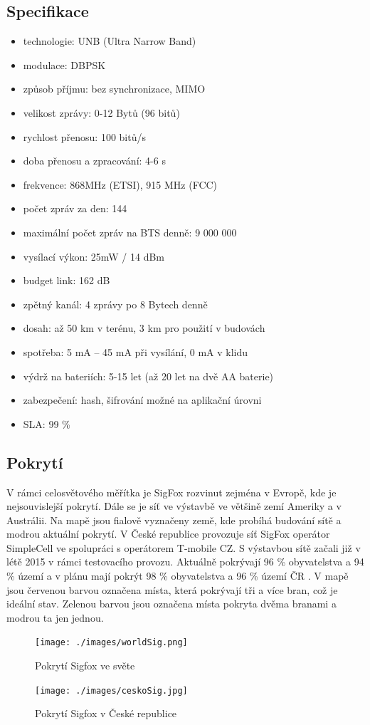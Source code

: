 \documentclass{ctuthesis}
\begin{document}
\subsection{Specifikace}
\begin{itemize}
\item technologie: UNB (Ultra Narrow Band)
\item modulace: DBPSK
\item způsob příjmu: bez synchronizace, MIMO
\item velikost zprávy: 0-12 Bytů (96 bitů)
\item rychlost přenosu: 100 bitů/s
\item doba přenosu a zpracování: 4-6 s
\item frekvence: 868MHz (ETSI), 915 MHz (FCC)
\item počet zpráv za den: 144
\item maximální počet zpráv na BTS denně: 9 000 000
\item vysílací výkon: 25mW / 14 dBm
\item budget link: 162 dB
\item zpětný kanál: 4 zprávy po 8 Bytech denně
\item dosah: až 50 km v terénu, 3 km pro použití v budovách
\item spotřeba: 5 mA – 45 mA při vysílání, 0 mA v klidu 
\item výdrž na bateriích: 5-15 let (až 20 let na dvě AA baterie)
\item zabezpečení: hash, šifrování možné na aplikační úrovni
\item SLA: 99 \% \cite{iotportalSigfox}
\end{itemize}
\subsection{Pokrytí}
V rámci celosvětového měřítka je SigFox rozvinut zejména v Evropě, kde je nejsouvislejší pokrytí. Dále se je síť ve výstavbě ve většině zemí Ameriky a v Austrálii.
Na mapě jsou fialově vyznačeny země, kde probíhá budování sítě a modrou aktuální pokrytí.
V České republice provozuje síť SigFox operátor SimpleCell ve spolupráci s operátorem T-mobile CZ. S výstavbou sítě začali již v létě 2015 v rámci testovacího provozu. Aktuálně pokrývají 96 \% obyvatelstva a 94 \% území a v plánu mají pokrýt 98 \% obyvatelstva a 96 \% území ČR \cite{simplecell}. V mapě jsou červenou barvou označena místa, která pokrývají tři a více bran, což je ideální stav.  Zelenou barvou jsou označena místa pokryta dvěma branami a modrou ta jen jednou.
\begin{figure}
\caption{Pokrytí Sigfox ve světe\cite{wolrdsigfox}}
\texttt{[image: ./images/worldSig.png]}
\label{sigfoxSvet}
\end{figure}
\begin{figure}
\caption{Pokrytí Sigfox v České republice \cite{iotportal}}
\texttt{[image: ./images/ceskoSig.jpg]}
\label{sigfoxCR}
\end{figure}
\end{document}
